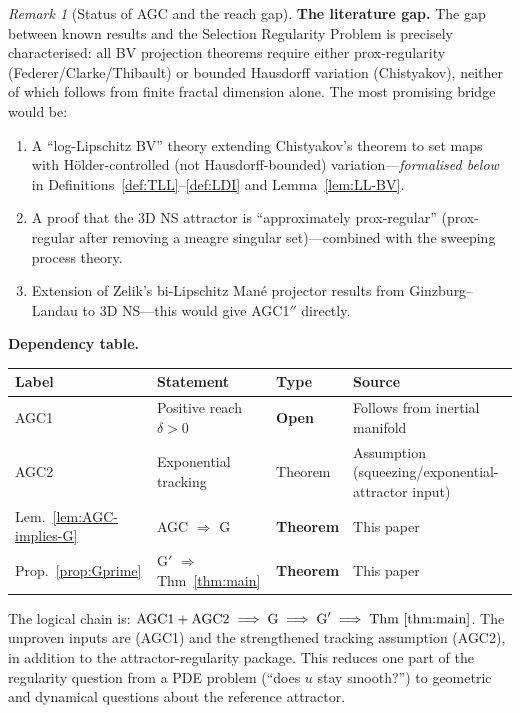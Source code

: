 \documentclass[12pt,a4paper]{article}
\theoremstyle{definition}
\theoremstyle{plain}
\theoremstyle{remark}
\newtheorem{remark}[definition]{Remark}
\begin{document}
\begin{remark}[Status of AGC and the reach gap]
\noindent
\textbf{The literature gap.}\;
The gap between known results and the Selection Regularity Problem is
precisely characterised: all BV projection theorems require either
prox-regularity (Federer/Clarke/Thibault) or bounded Hausdorff
variation (Chistyakov), neither of which follows from finite fractal
dimension alone.
The most promising bridge would be:
\begin{enumerate}
  \item A ``log-Lipschitz BV'' theory extending Chistyakov's theorem
    to set maps with H\"older-controlled (not Hausdorff-bounded)
    variation---\emph{formalised below} in
    Definitions~\ref{def:TLL}--\ref{def:LDI} and
    Lemma~\ref{lem:LL-BV}.
  \item A proof that the 3D NS attractor is ``approximately
    prox-regular'' (prox-regular after removing a meagre singular
    set)---combined with the sweeping process theory.
  \item Extension of Zelik's bi-Lipschitz Man\'e projector results
    from Ginzburg--Landau to 3D NS---this would give AGC1$''$
    directly.
\end{enumerate}

\medskip\noindent
\textbf{Dependency table.}
\medskip

\begin{center}
\begin{tabularx}{\textwidth}{@{}lYlY@{}}
\hline
\textbf{Label} & \textbf{Statement} & \textbf{Type} & \textbf{Source} \\
\hline
AGC1 & Positive reach $\delta > 0$ & \textbf{Open} &
  Follows from inertial manifold \\
AGC2 & Exponential tracking & Theorem &
  Assumption (squeezing/exponential-attractor input) \\
Lem.~\ref{lem:AGC-implies-G} & AGC $\Rightarrow$ G &
  \textbf{Theorem} & This paper \\
Prop.~\ref{prop:Gprime} & G$'$ $\Rightarrow$
  Thm~\ref{thm:main} & \textbf{Theorem} & This paper \\
\hline
\end{tabularx}
\end{center}

\medskip\noindent
The logical chain is:
$\textup{AGC1} + \textup{AGC2}
\;\Longrightarrow\;
\textup{G}
\;\Longrightarrow\;
\textup{G}'
\;\Longrightarrow\;
\textup{Thm~\ref{thm:main}}$.
The unproven inputs are \textup{(AGC1)} and the strengthened tracking
assumption \textup{(AGC2)}, in addition to the attractor-regularity
package.  This reduces one part of the regularity question from a PDE
problem (``does $u$ stay smooth?'') to geometric and dynamical questions
about the reference attractor.
\end{remark}
\end{document}
